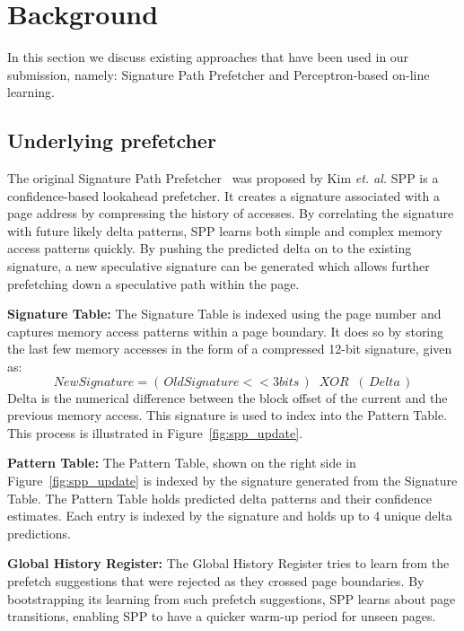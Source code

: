 \section{Background}
\label{Background}
In this section we discuss existing approaches that have been used in
our submission, namely: Signature Path Prefetcher and Perceptron-based
on-line learning.

\subsection{Underlying prefetcher}
\label{sec:Background-SPP}
The original Signature Path Prefetcher~\cite{SPP} was proposed by Kim
{\em et.  al.} SPP is a confidence-based lookahead prefetcher.  It
creates a signature associated with a page address by compressing the
history of accesses.  By correlating the signature with future likely
delta patterns, SPP learns both simple and complex memory access
patterns quickly.  By pushing the predicted delta on to the existing
signature, a new speculative signature can be generated which allows
further prefetching down a speculative path within the page.

\noindent \textbf{Signature Table:} The Signature Table is indexed
using the page number and captures memory access patterns within a
page boundary. It does so by storing the last few memory accesses in
the form of a compressed 12-bit signature, given as:
$$New Signature = (\,Old Signature << 3 bits\,) \;\;XOR\;\; (\,Delta\,)$$ 
Delta is the numerical difference between the block offset of the
current and the previous memory access. This signature is used to
index into the Pattern Table. This process is illustrated in
Figure~\ref{fig:spp_update}.

\noindent \textbf{Pattern Table:} The Pattern Table, shown on the
right side in Figure~\ref{fig:spp_update} is indexed by the signature
generated from the Signature Table. The Pattern Table holds predicted
delta patterns and their confidence estimates. Each entry is indexed
by the signature and holds up to 4 unique delta predictions.

\noindent \textbf{Global History Register:} The Global History
Register tries to learn from the prefetch suggestions that were
rejected as they crossed page boundaries. By bootstrapping its
learning from such prefetch suggestions, SPP learns about page
transitions, enabling SPP to have a quicker warm-up period for unseen
pages.


